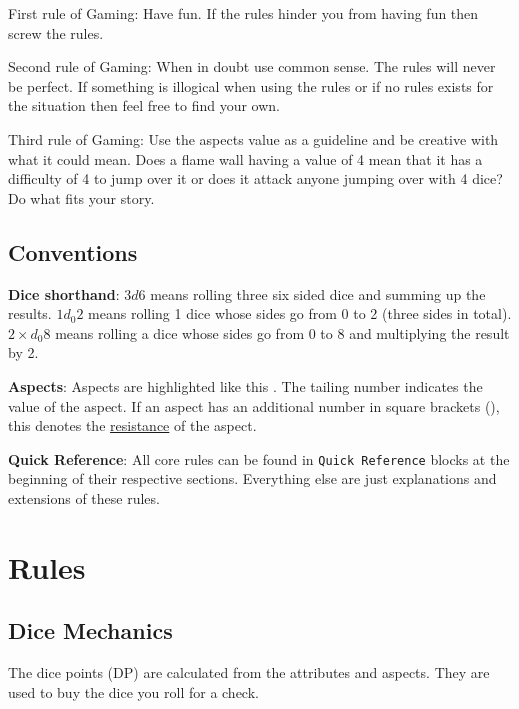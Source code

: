 \documentclass[11pt]{article}
\begin{document}
{First rule of Gaming: Have fun. If the rules hinder you from having fun then screw the rules.

Second rule of Gaming: When in doubt use common sense. The rules will never be perfect. If something is illogical when using the rules or if no rules exists for the situation then feel free to find your own. 

Third rule of Gaming: Use the aspects value as a guideline and be creative with what it could mean. Does a flame wall having a value of 4 mean that it has a difficulty of 4 to jump over it or does it attack anyone jumping over with 4 dice? Do what fits your story. 
\subsection{Conventions}
\label{sec:org5cbc2fe}
\textbf{Dice shorthand}: \(3 d 6\) means rolling three six sided dice and summing up the results. \(1 d_0 2\) means rolling 1 dice whose sides go from 0 to 2 (three sides in total). \(2 \times d_0 8\) means rolling a dice whose sides go from 0 to 8 and multiplying the result by 2.

\textbf{Aspects}: Aspects are highlighted like this . The tailing number indicates the value of the aspect. If an aspect has an additional number in square brackets (), this denotes the \hyperref[sec:orgf0a3c53]{resistance} of the aspect. 

\textbf{Quick Reference}: All core rules can be found in \texttt{Quick Reference} blocks at the beginning of their respective sections. Everything else are just explanations and extensions of these rules.
\section{Rules}
\label{sec:org0b5df96}

\subsection{Dice Mechanics}
\label{sec:orgdac8b0a}
\begin{short}
The dice points (DP) are calculated from the attributes and aspects. They are used to buy the dice you roll for a check.


\end{short}}
\end{document}
